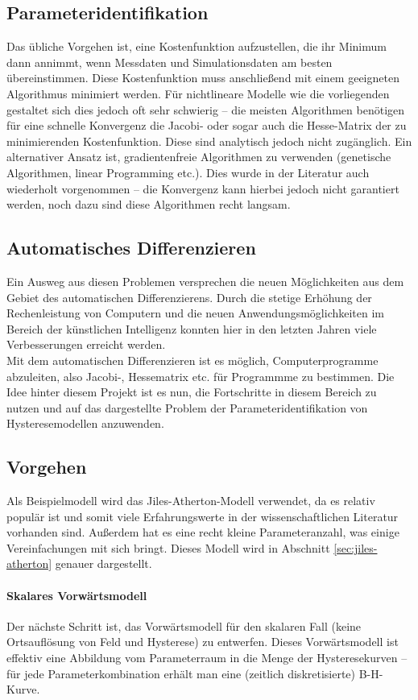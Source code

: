 \documentclass{scrartcl}
\begin{document}
\subsection{Parameteridentifikation}
Das übliche Vorgehen ist, eine Kostenfunktion aufzustellen, die ihr Minimum dann annimmt, wenn Messdaten und Simulationsdaten am besten übereinstimmen. Diese Kostenfunktion muss anschließend mit einem geeigneten Algorithmus minimiert werden. Für nichtlineare Modelle wie die vorliegenden gestaltet sich dies jedoch oft sehr schwierig -- die meisten Algorithmen benötigen für eine schnelle Konvergenz die Jacobi- oder sogar auch die Hesse-Matrix der zu minimierenden Kostenfunktion. Diese sind analytisch jedoch nicht zugänglich. Ein alternativer Ansatz ist, gradientenfreie Algorithmen zu verwenden (genetische Algorithmen, linear Programming etc.). Dies wurde in der Literatur auch wiederholt vorgenommen -- die Konvergenz kann hierbei jedoch nicht garantiert werden, noch dazu sind diese Algorithmen recht langsam.
\subsection{Automatisches Differenzieren}
Ein Ausweg aus diesen Problemen versprechen die neuen Möglichkeiten aus dem Gebiet des automatischen Differenzierens. Durch die stetige Erhöhung der Rechenleistung von Computern und die neuen Anwendungsmöglichkeiten im Bereich der künstlichen Intelligenz konnten hier in den letzten Jahren viele Verbesserungen erreicht werden.\\
Mit dem automatischen Differenzieren ist es möglich, Computerprogramme abzuleiten, also Jacobi-, Hessematrix etc. für Programmme zu bestimmen. Die Idee hinter diesem Projekt ist es nun, die Fortschritte in diesem Bereich zu nutzen und auf das dargestellte Problem der Parameteridentifikation von Hysteresemodellen anzuwenden.
\subsection{Vorgehen}
Als Beispielmodell wird das Jiles-Atherton-Modell verwendet, da es relativ populär ist und somit viele Erfahrungswerte in der wissenschaftlichen Literatur vorhanden sind. Außerdem hat es eine recht kleine Parameteranzahl, was einige Vereinfachungen mit sich bringt. Dieses Modell wird in Abschnitt \ref{sec:jiles-atherton} genauer dargestellt.\\
\paragraph{Skalares Vorwärtsmodell} Der nächste Schritt ist, das Vorwärtsmodell für den skalaren Fall (keine Ortsauflösung von Feld und Hysterese) zu entwerfen. Dieses Vorwärtsmodell ist effektiv eine Abbildung vom Parameterraum in die Menge der Hysteresekurven -- für jede Parameterkombination erhält man eine (zeitlich diskretisierte) B-H-Kurve.
\end{document}
